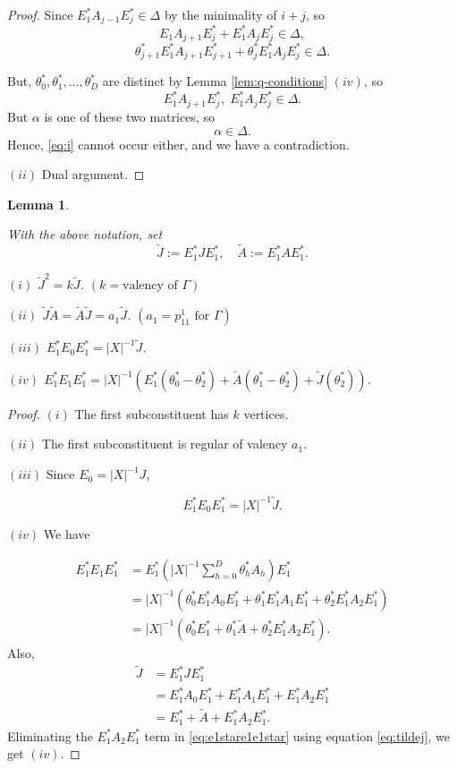 \documentclass[
]{book}
\newtheorem{lemma}{Lemma}[chapter]
\theoremstyle{definition}
\theoremstyle{definition}
\theoremstyle{definition}
\theoremstyle{definition}
\theoremstyle{remark}
\begin{document}
\begin{proof}
Since \(E^*_1A_{j-1}E^*_j\in \Delta\) by the minimality of \(i+j\), so
\[E_1A_{j+1}E^*_j + E^*_1A_jE^*_j \in \Delta,\]
\[\theta^*_{j+1}E^*_1A_{j+1}E^*_{j+1} + \theta^*_jE^*_1A_jE^*_j \in \Delta.\]

But, \(\theta^*_0, \theta^*_1, \ldots, \theta^*_D\) are distinct by Lemma \ref{lem:q-conditions} \((iv)\),
so
\[E^*_1A_{j+1}E^*_j, \; E^*_1A_jE^*_j\in \Delta.\]
But \(\alpha\) is one of these two matrices, so
\[\alpha \in \Delta.\]
Hence, \eqref{eq:i} cannot occur either, and we have a contradiction.

\((ii)\) Dual argument.

\end{proof}

\begin{lemma}
\protect\hypertarget{lem:tildej-tildea}{}\label{lem:tildej-tildea}

With the above notation, set
\[\tilde{J}:= E^*_1JE^*_1, \quad \tilde{A}:= E^*_1AE^*_1.\]

\((i)\) \(\tilde{J}^2 = k\tilde{J}\). \((k = \text{valency of $\Gamma$})\)

\((ii)\) \(\tilde{J}\tilde{A} = \tilde{A}\tilde{J} = a_1\tilde{J}\). \((a_1 = p^{1}_{11} \text{ for } \Gamma)\)

\((iii)\) \(E_1^*E_0E^*_1 = |X|^{-1}\tilde{J}\).

\((iv)\) \(E^*_1E_1E^*_1 = |X|^{-1}(E^*_1(\theta^*_0-\theta^*_2)+\tilde{A}(\theta^*_{1}-\theta^*_2)+\tilde{J}(\theta^*_2))\).

\end{lemma}

\begin{proof}
\leavevmode

\((i)\) The first subconstituent has \(k\) vertices.

\((ii)\) The first subconstituent is regular of valency \(a_1\).

\((iii)\) Since \(E_0 = |X|^{-1}J\),

\[E^*_1E_0E^*_1 = |X|^{-1}\tilde{J}.\]

\((iv)\) We have

\begin{align}
E^*_1E_1E^*_1 & = E^*_1\left(|X|^{-1}\sum_{h=0}^D\theta^*_h A_h\right)E^*_1\\
& = |X|^{-1}(\theta^*_0E^*_1A_0E^*_1 + \theta^*_1E^*_1A_1E^*_1 + \theta^*_2E^*_1A_2E^*_1)\\
& = |X|^{-1}(\theta^*_0E^*_1 + \theta^*_1\tilde{A} + \theta^*_2E^*_1A_2E^*_1). \label{eq:e1stare1e1star}
\end{align}
Also,
\begin{align}
\tilde{J} & = E^*_1JE^*_1\\
& = E^*_1A_0E^*_1 + E^*_1A_1E^*_1 + E^*_1A_2E^*_1\\
& = E^*_1 + \tilde{A} + E^*_1A_2E^*_1. \label{eq:tildej}
\end{align}
Eliminating the \(E^*_1A_2E^*_1\) term in \eqref{eq:e1stare1e1star} using equation \eqref{eq:tildej}, we get \((iv)\).

\end{proof}
\end{document}
